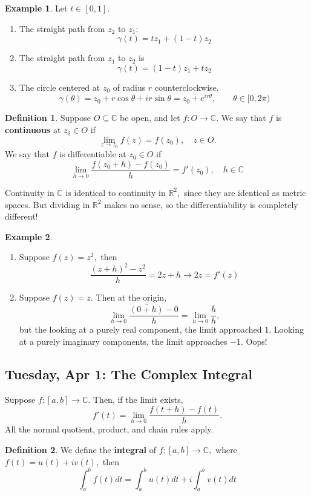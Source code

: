 \documentclass[10pt, oneside]{article}
\newcommand{\bbR}{\mathbb{R}}
\newcommand{\bbC}{\mathbb{C}}
\theoremstyle{definition}
\newtheorem{exmp}{Example}[section]
\newtheorem{defn}{Definition}
\begin{document}
\begin{exmp}
Let $t\in [0,1].$ \begin{enumerate}
    \item The straight path from $z_2$ to $z_1$:
    \[\gamma(t) = tz_1 + (1-t)z_2\]
    \item The straight path from $z_1$ to $z_2$ is 
    \[\gamma(t) = (1-t)z_1 + tz_2\]
    \item The circle centered at $z_0$ of radius $r$ counterclockwise. 
    \[\gamma(\theta) = z_0 + r\cos\theta  + ir\sin\theta = z_0 + e^{ir\theta}, \qquad \theta \in [0, 2\pi)\]
\end{enumerate}
\end{exmp}

\begin{defn}
    Suppose $O \subseteq \bbC$ be open, and let $f: O \to \bbC.$ We say that $f$ is \textbf{continuous} at $z_0 \in O$ if 
    \[\lim_{z \to z_0}f(z) = f(z_0), \quad z \in O.\] We say that $f$ is differentiable at $z_0 \in O$ if 
    \[\lim_{h\to 0}\frac{f(z_0 + h) - f(z_0)}{h} = f'(z_0), \quad h \in \bbC\]
\end{defn}
Continuity in $\bbC$ is identical to continuity in $\bbR^2,$ since they are identical as metric spaces. But dividing in $\bbR^2$ makes no sense, so the differentiability is completely different!
\begin{exmp}
    \begin{enumerate}
        \item Suppose $f(z) = z^2,$ then 
        \[\frac{(z + h)^2 - z^2}{h} = 2z + h \to 2z = f'(z)\]
        \item Suppose $f(z) = \overline{z}.$ Then at the origin, 
        \[\lim_{h\to 0}\frac{\overline{(0 + h)} - \overline{0}}{h}= \lim_{h\to 0}\frac{\overline{h}}{h},\] but the looking at a purely real component, the limit approached $1.$ Looking at a purely imaginary components, the limit approaches $-1.$ Oops!
    \end{enumerate}
\end{exmp}

\newpage
\subsection{Tuesday, Apr 1: The Complex Integral}
Suppose $f: [a,b] \to \bbC.$ Then, if the limit exists,
\[f'(t) = \lim_{h\to 0}\frac{f(t+  h) - f(t)}{h}.\] All the normal quotient, product, and chain rules apply.

\begin{defn}
    We define the \textbf{integral} of $f: [a,b] \to \bbC,$ where $f(t) = u(t) + iv(t),$ then 
    \[\int_a^b f(t)dt = \int_a^b u(t)dt + i \int_a^b v(t)dt\]
\end{defn}
\end{document}
